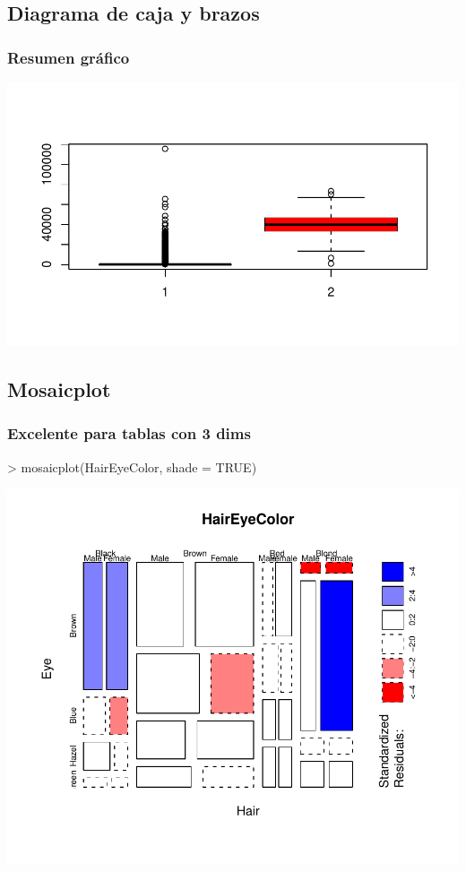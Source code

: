 \subsection{Diagrama de caja y brazos}

\begin{frame}
  \frametitle{Resumen gráfico}
\begin{Schunk}
\end{Schunk}
\includegraphics{plots/figura-029}
\end{frame}


\subsection{Mosaicplot}

\begin{frame}
  \frametitle{Excelente para tablas con 3 dims}
\begin{Schunk}
\begin{Sinput}
> mosaicplot(HairEyeColor, shade = TRUE)
\end{Sinput}
\end{Schunk}
\includegraphics{plots/figura-030}
\end{frame}

